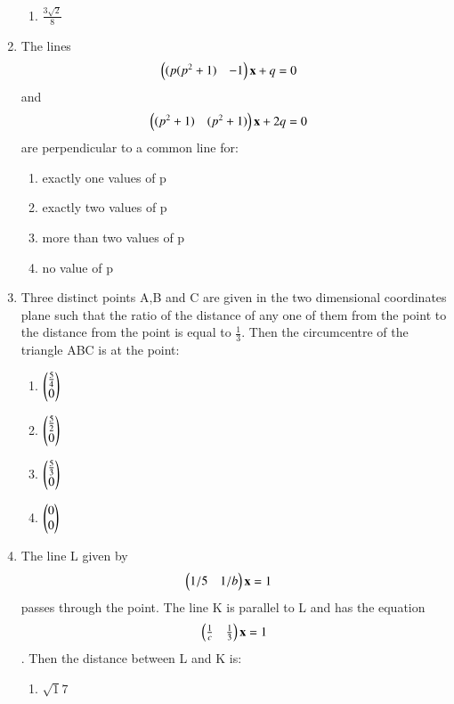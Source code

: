 \begin{enumerate}
\begin{enumerate}
     \item  $\frac{3\sqrt2}{8}$\\
     \end{enumerate}
    \item The lines \begin{align}\begin{pmatrix}(p(p^2+1) & -1\end{pmatrix}\mathbf{x} + q &= 0\end{align} and \begin{align}\begin{pmatrix}(p^2+1) & (p^2+1)\end{pmatrix}\mathbf{x} + 2q &= 0\end{align} are perpendicular to a common line for:
    \begin{enumerate}
     \item  exactly one values of p
     \item  exactly two values of p
     \item  more than two values of p
     \item  no value of p
     \end{enumerate}
    \item Three distinct points A,B and C are given in the two dimensional coordinates plane such that the ratio of the distance of any one of them from the point to the distance from the point is equal to $\frac{1}{3}$. Then the circumcentre of the triangle ABC is at the point:
    \begin{enumerate}
     \item  $\begin{pmatrix}\frac{5}{4}\\0\end{pmatrix}$
     \item  $\begin{pmatrix}\frac{5}{2}\\0\end{pmatrix}$
     \item  $\begin{pmatrix}\frac{5}{3}\\0\end{pmatrix}$
     \item  $\begin{pmatrix}0\\0\end{pmatrix}$
     \end{enumerate}
    \item The line L given by \begin{align}\begin{pmatrix}1/5 & 1/b\end{pmatrix}\mathbf{x} &= 1\end{align}  passes through the point. The line K is parallel to L and has the equation \begin{align}\begin{pmatrix}\frac{1}{c} & \frac{1}{3}\end{pmatrix}\mathbf{x} = 1\end{align}. Then the distance between L and K is:
    \begin{enumerate}
     \item  $\sqrt17$

\end{enumerate}
\end{enumerate}
